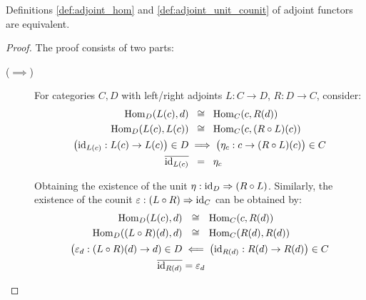 \begin{theorem}
  Definitions \ref{def:adjoint_hom} and \ref{def:adjoint_unit_counit} of adjoint
  functors are equivalent.

  \begin{proof}
    The proof consists of two parts:
    \begin{description}
      \item[($\implies$)] For categories $C,D$ with left/right adjoints $L:C\to
        D$, $R:D\to C$, consider:
        \[
          \begin{aligned}
            \mathrm{Hom}_D(L(c), d) &\ \:\cong\ \: \mathrm{Hom}_C(c, R(d))\\
            \mathrm{Hom}_D(L(c), L(c)) &\ \:\cong\ \: \mathrm{Hom}_C(c, (R\circ L)(c))\\
            \big(\mathrm{id}_{L(c)}: L(c) \to L(c)\big) \in D
            &\implies \big(\eta_c : c \to (R\circ L)(c)\big)\in C\\
            \overline{\mathrm{id}_{L(c)}} &\ \:=\ \:\eta_c
          \end{aligned}
        \]

        Obtaining the existence of the unit $\eta:\mathrm{id}_D\Rightarrow (R\circ L)$.
        Similarly, the existence of the counit $\varepsilon:(L\circ
        R)\Rightarrow\mathrm{id}_C$ can be obtained by:
        \[
          \begin{aligned}
            \mathrm{Hom}_D(L(c), d) &\ \ \cong\ \ \mathrm{Hom}_C(c, R(d))\\
            \mathrm{Hom}_D((L\circ R)(d), d) &\ \ \cong\ \ \mathrm{Hom}_C(R(d), R(d))\\
            \big(\varepsilon_{d} : (L\circ R)(d) \to d) \in D
            &\impliedby \big(\mathrm{id}_{R(d)}: R(d) \to R(d)\big) \in C\\
            \overline{\mathrm{id}_{R(d)}} &= \varepsilon_d
          \end{aligned}
        \]


\end{description}
\end{proof}
\end{theorem}
